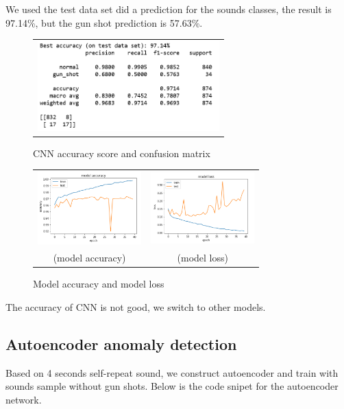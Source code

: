 \documentclass{article}
\begin{document}
We used the test data set did a prediction for the sounds classes, the result is 97.14\%, but the gun shot prediction is 57.63\%.
\begin{figure}[!htb]
	\begin{tabular}{c}
		\includegraphics[width=7cm]{pic/CNN_Pm_V2.PNG}\\
	\end{tabular}
	\caption{CNN accuracy score and confusion matrix\label{figure8}}
\end{figure}

\begin{figure}[!htb]
	\begin{tabular}{cc}
		\includegraphics[width=4cm]{pic/CNN_ACC_V2.PNG}
		&\includegraphics[width=4cm]{pic/CNN_Loss_V2.PNG}\\
		(model accuracy)&(model loss)
	\end{tabular}
	\caption{Model accuracy and model loss\label{figure9}}
\end{figure}
The accuracy of CNN is not good, we switch to other models.

\newpage
\subsection{Autoencoder anomaly detection}
Based on 4 seconds self-repeat sound, we construct autoencoder and train with sounds sample without gun shots. Below is the code snipet for the autoencoder network.
\end{document}
